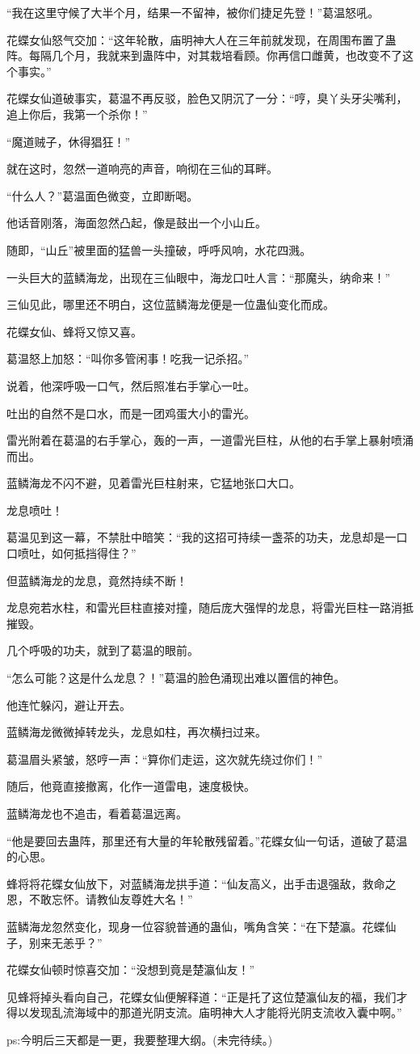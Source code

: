 \begin{this_body}
“我在这里守候了大半个月，结果一不留神，被你们捷足先登！”葛温怒吼。

花蝶女仙怒气交加：“这年轮散，庙明神大人在三年前就发现，在周围布置了蛊阵。每隔几个月，我就来到蛊阵中，对其栽培看顾。你再信口雌黄，也改变不了这个事实。”

花蝶女仙道破事实，葛温不再反驳，脸色又阴沉了一分：“哼，臭丫头牙尖嘴利，追上你后，我第一个杀你！”

“魔道贼子，休得猖狂！”

就在这时，忽然一道响亮的声音，响彻在三仙的耳畔。

“什么人？”葛温面色微变，立即断喝。

他话音刚落，海面忽然凸起，像是鼓出一个小山丘。

随即，“山丘”被里面的猛兽一头撞破，呼呼风响，水花四溅。

一头巨大的蓝鳞海龙，出现在三仙眼中，海龙口吐人言：“那魔头，纳命来！”

三仙见此，哪里还不明白，这位蓝鳞海龙便是一位蛊仙变化而成。

花蝶女仙、蜂将又惊又喜。

葛温怒上加怒：“叫你多管闲事！吃我一记杀招。”

说着，他深呼吸一口气，然后照准右手掌心一吐。

吐出的自然不是口水，而是一团鸡蛋大小的雷光。

雷光附着在葛温的右手掌心，轰的一声，一道雷光巨柱，从他的右手掌上暴射喷涌而出。

蓝鳞海龙不闪不避，见着雷光巨柱射来，它猛地张口大口。

龙息喷吐！

葛温见到这一幕，不禁肚中暗笑：“我的这招可持续一盏茶的功夫，龙息却是一口口喷吐，如何抵挡得住？”

但蓝鳞海龙的龙息，竟然持续不断！

龙息宛若水柱，和雷光巨柱直接对撞，随后庞大强悍的龙息，将雷光巨柱一路消抵摧毁。

几个呼吸的功夫，就到了葛温的眼前。

“怎么可能？这是什么龙息？！”葛温的脸色涌现出难以置信的神色。

他连忙躲闪，避让开去。

蓝鳞海龙微微掉转龙头，龙息如柱，再次横扫过来。

葛温眉头紧皱，怒哼一声：“算你们走运，这次就先绕过你们！”

随后，他竟直接撤离，化作一道雷电，速度极快。

蓝鳞海龙也不追击，看着葛温远离。

“他是要回去蛊阵，那里还有大量的年轮散残留着。”花蝶女仙一句话，道破了葛温的心思。

蜂将将花蝶女仙放下，对蓝鳞海龙拱手道：“仙友高义，出手击退强敌，救命之恩，不敢忘怀。请教仙友尊姓大名！”

蓝鳞海龙忽然变化，现身一位容貌普通的蛊仙，嘴角含笑：“在下楚瀛。花蝶仙子，别来无恙乎？”

花蝶女仙顿时惊喜交加：“没想到竟是楚瀛仙友！”

见蜂将掉头看向自己，花蝶女仙便解释道：“正是托了这位楚瀛仙友的福，我们才得以发现乱流海域中的那道光阴支流。庙明神大人才能将光阴支流收入囊中啊。”

ps:今明后三天都是一更，我要整理大纲。(未完待续。)

\end{this_body}

